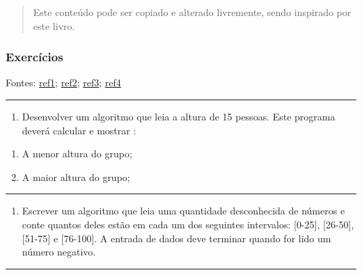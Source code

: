 \documentclass[12pt,a4paper]{article}
\renewcommand{\linethickness}{0.05em}
\providecommand{\tightlist}{%
      \setlength{\itemsep}{0pt}\setlength{\parskip}{0pt}}
\begin{document}
\begin{quote}
Este conteúdo pode ser copiado e alterado livremente, sendo inspirado
por este livro.
\end{quote}

    \hypertarget{exercuxedcios}{%
\subsubsection{Exercícios}\label{exercuxedcios}}

Fontes:
\href{https://docente.ifrn.edu.br/jonathanpereira/disciplinas/algoritmos/lista-de-exercicios-estruturas-de-repeticao-1/view}{ref1};
\href{https://www.inf.pucrs.br/flash/cbp/exwhile.html}{ref2};
\href{https://www.inf.pucrs.br/~pinho/LaproI/Exercicios/Repeticao/Lista1.htm}{ref3};
\href{https://pessoal.dainf.ct.utfpr.edu.br/leoneloalmeida/cursos/if71a-s83-2016-01/algoritmos_3_exerc.pdf}{ref4}

    \begin{center}\rule{0.5\linewidth}{\linethickness}\end{center}

\begin{enumerate}
\def\labelenumi{\arabic{enumi}.}
\tightlist
\item
  Desenvolver um algoritmo que leia a altura de 15 pessoas. Este
  programa deverá calcular e mostrar :
\end{enumerate}

\begin{enumerate}
\def\labelenumi{\alph{enumi}.}
\item
  A menor altura do grupo;
\item
  A maior altura do grupo;
\end{enumerate}

    \begin{center}\rule{0.5\linewidth}{\linethickness}\end{center}

\begin{enumerate}
\def\labelenumi{\arabic{enumi}.}
\setcounter{enumi}{1}
\tightlist
\item
  Escrever um algoritmo que leia uma quantidade desconhecida de números
  e conte quantos deles estão em cada um dos seguintes intervalos:
  {[}0-25{]}, {[}26-50{]}, {[}51-75{]} e {[}76-100{]}. A entrada de
  dados deve terminar quando for lido um número negativo.
\end{enumerate}

    \begin{center}\rule{0.5\linewidth}{\linethickness}\end{center}
\end{document}
